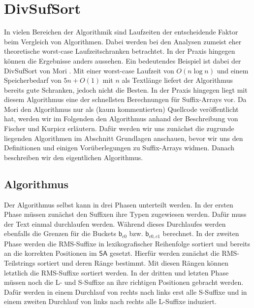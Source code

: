 \section{DivSufSort}
\label{algorithm:divsufsort}

In  vielen Bereichen der Algorithmik sind Laufzeiten der entscheidende Faktor beim Vergleich von Algorithmen. Dabei werden bei den Analysen zumeist eher theoretische worst-case Laufzeitschranken betrachtet.
In der Praxis hingegen können die Ergebnisse anders aussehen. Ein bedeutendes Beispiel ist dabei der DivSufSort von Mori \cite{saca:5:repo}. Mit einer worst-case Laufzeit von $O(n\log{n})$ und einem Speicherbedarf von $5n + O(1)$ mit $n$ als Textlänge liefert der Algorithmus bereits gute Schranken, jedoch nicht die Besten. In der Praxis hingegen liegt mit diesem Algorithmus eine der schnellsten Berechnungen für Suffix-Arrays vor. Da Mori den Algorithmus nur als (kaum kommentierten) Quellcode veröffentlicht hat, werden wir im Folgenden den Algorithmus anhand der Beschreibung von Fischer und Kurpicz \cite{saca:5} erläutern. Dafür werden wir uns zunächst die zugrunde liegenden Algorithmen im Abschnitt Grundlagen anschauen, bevor wir uns den Definitionen und einigen Vorüberlegungen zu Suffix-Arrays widmen. Danach beschreiben wir den eigentlichen Algorithmus.




\subsection{Algorithmus}

Der Algorithmus selbst kann in drei Phasen unterteilt werden. In der ersten Phase müssen zunächst den Suffixen ihre Typen zugewiesen werden. Dafür muss der Text einmal durchlaufen werden. Während dieses Durchlaufes werden ebenfalls die Grenzen für die Buckets $\mathsf{b}_{c0}$ bzw. $\mathsf{b}_{c0,c1}$ berechnet. In der zweiten Phase werden die RMS-Suffixe in lexikografischer Reihenfolge sortiert und bereits an die korrekten Positionen im $\mathsf{SA}$ gesetzt. Hierfür werden zunächst die RMS-Teilstrings sortiert und deren Ränge bestimmt. Mit diesen Rängen können letztlich die RMS-Suffixe sortiert werden. In der dritten und letzten Phase müssen noch die L- und S-Suffixe an ihre richtigen Positionen gebracht werden. Dafür werden in einem Durchlauf von rechts nach links erst alle S-Suffixe und in einem zweiten Durchlauf von links nach rechts alle L-Suffixe induziert.

